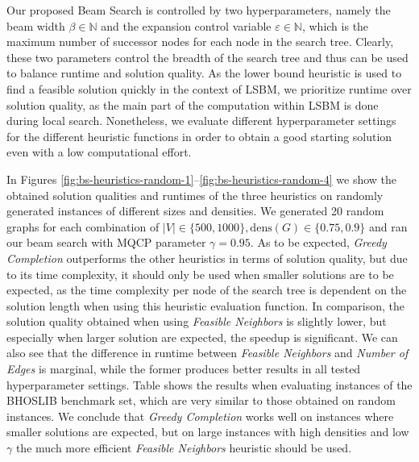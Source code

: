 \documentclass[draft,final]{vutinfth} %
\begin{document}
Our proposed Beam Search is controlled by two hyperparameters, namely the beam width $\beta \in \mathbb{N}$ and the expansion control variable $\varepsilon \in \mathbb{N}$, which is the maximum number of successor nodes for each node in the search tree. Clearly, these two parameters control the breadth of the search tree and thus can be used to balance runtime and solution quality. 
As the lower bound heuristic is used to find a feasible solution quickly in the context of LSBM, we prioritize runtime over solution quality, as the main part of the computation within LSBM is done during local search. Nonetheless, we evaluate different hyperparameter settings for the different heuristic functions in order to obtain a good starting solution even with a low computational effort. 

In Figures \ref{fig:bs-heuristics-random-1}--\ref{fig:bs-heuristics-random-4} 
we show the obtained solution qualities and runtimes of the three heuristics on randomly generated instances of different sizes and densities. We generated 20 random graphs for each combination of $|V| \in \{500, 1000\}, \mathrm{dens}(G) \in \{0.75, 0.9\}$ and ran our beam search with MQCP parameter $\gamma=0.95$. 
As to be expected, \emph{Greedy Completion} outperforms the other heuristics in terms of solution quality, but due to its time complexity, it should only be used when smaller solutions are to be expected, as the time complexity per node of the search tree is dependent on the solution length when using this heuristic evaluation function. 
In comparison, the solution quality obtained when using \emph{Feasible Neighbors} is slightly lower, but especially when larger solution are expected, the speedup is significant.  
We can also see that the difference in runtime between \emph{Feasible Neighbors} and \emph{Number of Edges} is marginal, while the former produces better results in all tested hyperparameter settings. 
Table %
shows the results when evaluating instances of the BHOSLIB benchmark set, which are very similar to those obtained on random instances. 
We conclude that \emph{Greedy Completion} works well on instances where smaller solutions are expected, but on large instances with high densities and low $\gamma$ the much more efficient \emph{Feasible Neighbors} heuristic should be used. 

\end{document}
